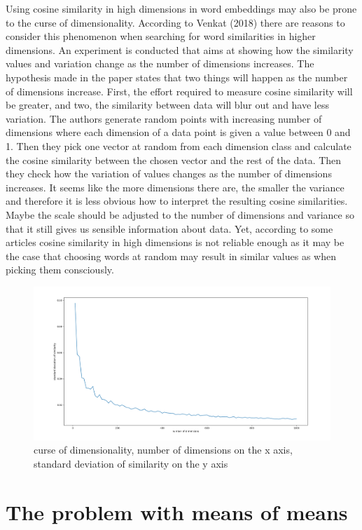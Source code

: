 \documentclass[10pt,dvipsnames,enabledeprecatedfontcommands]{scrartcl}
\begin{document}
Using cosine similarity in high dimensions in word embeddings may also
be prone to the curse of dimensionality. According to Venkat (2018)
there are reasons to consider this phenomenon when searching for word
similarities in higher dimensions. An experiment is conducted that aims
at showing how the similarity values and variation change as the number
of dimensions increases. The hypothesis made in the paper states that
two things will happen as the number of dimensions increase. First, the
effort required to measure cosine similarity will be greater, and two,
the similarity between data will blur out and have less variation. The
authors generate random points with increasing number of dimensions
where each dimension of a data point is given a value between 0 and 1.
Then they pick one vector at random from each dimension class and
calculate the cosine similarity between the chosen vector and the rest
of the data. Then they check how the variation of values changes as the
number of dimensions increases. It seems like the more dimensions there
are, the smaller the variance and therefore it is less obvious how to
interpret the resulting cosine similarities. Maybe the scale should be
adjusted to the number of dimensions and variance so that it still gives
us sensible information about data. Yet, according to some articles
cosine similarity in high dimensions is not reliable enough as it may be
the case that choosing words at random may result in similar values as
when picking them consciously.

\begin{figure}
\centering
\includegraphics{../images/curseOfDimensionality.png}
\caption{curse of dimensionality, number of dimensions on the x axis,
standard deviation of similarity on the y axis}
\end{figure}

\section{The problem with means of
means}\label{the-problem-with-means-of-means}
\end{document}
